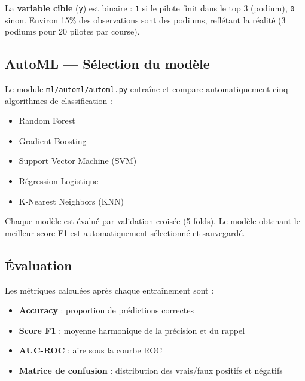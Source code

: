 \documentclass[12pt, a4paper]{article}
\begin{document}
La \textbf{variable cible} (\texttt{y}) est binaire : \texttt{1} si le pilote finit dans le top 3 (podium), \texttt{0} sinon. Environ 15\% des observations sont des podiums, reflétant la réalité (3 podiums pour 20 pilotes par course).

\subsection{AutoML — Sélection du modèle}

Le module \texttt{ml/automl/automl.py} entraîne et compare automatiquement cinq algorithmes de classification :

\begin{itemize}
    \item Random Forest
    \item Gradient Boosting
    \item Support Vector Machine (SVM)
    \item Régression Logistique
    \item K-Nearest Neighbors (KNN)
\end{itemize}

Chaque modèle est évalué par validation croisée (5 folds). Le modèle obtenant le meilleur score F1 est automatiquement sélectionné et sauvegardé.

\subsection{Évaluation}

Les métriques calculées après chaque entraînement sont :

\begin{itemize}
    \item \textbf{Accuracy} : proportion de prédictions correctes
    \item \textbf{Score F1} : moyenne harmonique de la précision et du rappel
    \item \textbf{AUC-ROC} : aire sous la courbe ROC
    \item \textbf{Matrice de confusion} : distribution des vrais/faux positifs et négatifs
\end{itemize}

\end{document}
